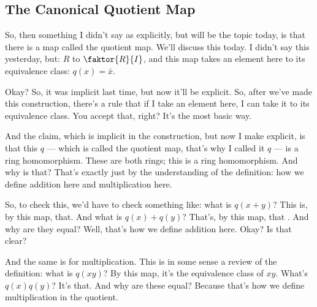 \subsection{The Canonical Quotient Map}

\begin{speech}[00:01:10 - 00:02:45]
So, then something I didn't say as explicitly, but will be the topic today, is that there is a map called the quotient map. We'll discuss this today. I didn't say this yesterday, but:  $R$ to $\faktor{R}{I}$, and this map takes an element here to its equivalence class:  $q(x) = \bar{x}$.

Okay? So, it was implicit last time, but now it'll be explicit. So, after we've made this construction, there's a rule that if I take an element here, I can take it to its equivalence class. You accept that, right? It's the most basic way.

And the claim, which is implicit in the construction, but now I make explicit, is that this $q$ --- which is called the quotient map, that's why I called it $q$ --- is a ring homomorphism.  These are both rings; this is a ring homomorphism. And why is that? That's exactly just by the understanding of the definition: how we define addition here and multiplication here.

So, to check this, we'd have to check something like: what is $q(x + y)$?  This is, by this map, that. And what is $q(x) + q(y)$? That's, by this map, that . And why are they equal? Well, that's how we define addition here.  Okay? Is that clear?

And the same is for multiplication. This is in some sense a review of the definition: what is $q(xy)$? By this map, it's the equivalence class of $xy$.  What's $q(x) q(y)$?  It's that. And why are these equal? Because that's how we define multiplication in the quotient.
\end{speech}

